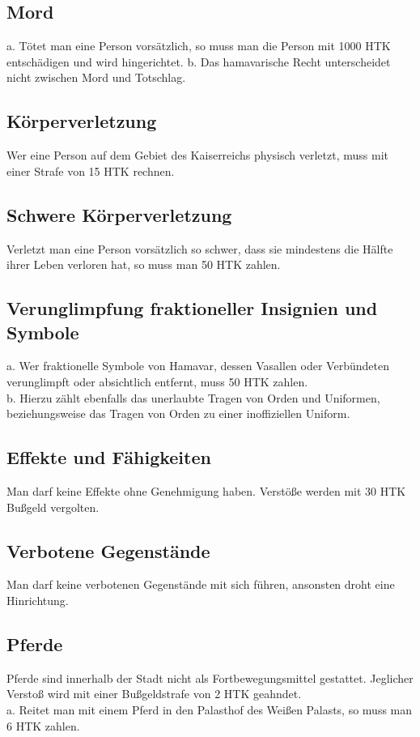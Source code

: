 \documentclass{article}
\begin{document}
\subsection{Mord}
a. Tötet man eine Person vorsätzlich, so muss man die Person mit 1000 HTK entschädigen und wird hingerichtet.
b. Das hamavarische Recht unterscheidet nicht zwischen Mord und Totschlag.

\subsection{Körperverletzung}
Wer eine Person auf dem Gebiet des Kaiserreichs physisch verletzt, muss mit einer Strafe von 15 HTK rechnen.

\subsection{Schwere Körperverletzung}
Verletzt man eine Person vorsätzlich so schwer, dass sie mindestens die Hälfte ihrer Leben verloren hat, so muss man 50 HTK zahlen.

\subsection{Verunglimpfung fraktioneller Insignien und Symbole}
a. Wer fraktionelle Symbole von Hamavar, dessen Vasallen oder Verbündeten verunglimpft oder absichtlich entfernt, muss 50 HTK zahlen.\\
b. Hierzu zählt ebenfalls das unerlaubte Tragen von Orden und Uniformen, beziehungsweise das Tragen von Orden zu einer inoffiziellen Uniform.

\subsection{Effekte und Fähigkeiten}
Man darf keine Effekte ohne Genehmigung haben. Verstöße werden mit 30 HTK Bußgeld vergolten.

\subsection{Verbotene Gegenstände}
Man darf keine verbotenen Gegenstände mit sich führen, ansonsten droht eine Hinrichtung.

\subsection{Pferde}
Pferde sind innerhalb der Stadt nicht als Fortbewegungsmittel gestattet. Jeglicher Verstoß wird mit einer Bußgeldstrafe von 2 HTK geahndet.\\
a. Reitet man mit einem Pferd in den Palasthof des Weißen Palasts, so muss man 6 HTK zahlen.
\end{document}
